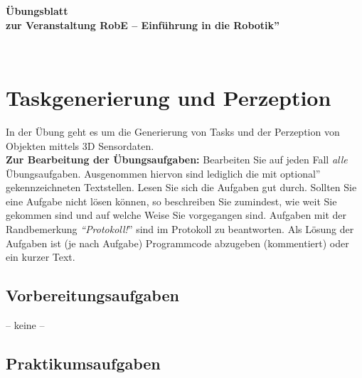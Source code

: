 \documentclass[ti,nofooter]{own-haw-page}
\begin{document}
\date{22.~November~2021}


\setcounter{section}{6}
\setcounter{dummymcpdsv}{\value{section}}
\addtocounter{dummymcpdsv}{1}


\begin{page}

\begin{Large}
{\centering \bfseries \"{U}bungsblatt \\ zur Veranstaltung  
\glqq RobE -- Einf\"{u}hrung in die Robotik''\\}
\end{Large}
~\\[-0.5cm]


\section{Taskgenerierung und Perzeption}

In der \"{U}bung  geht es um die Generierung von Tasks und der Perzeption von Objekten mittels 3D Sensordaten. \\


\textbf{Zur Bearbeitung der \"{U}bungsaufgaben:} Bearbeiten Sie auf jeden Fall
\textit{alle} \"{U}bungsaufgaben. Ausgenommen hiervon sind lediglich die mit \glqq
optional'' gekennzeichneten Textstellen. Lesen Sie sich die Aufgaben gut durch.
Sollten Sie eine Aufgabe nicht l\"{o}sen k\"{o}nnen, so beschreiben Sie
zumindest, wie weit Sie gekommen sind und auf welche Weise Sie vorgegangen sind.
%
Aufgaben mit der Randbemerkung \textit{``Protokoll!}'' sind 
im Protokoll zu beantworten.
Als L\"{o}sung der Aufgaben ist %
(je nach Aufgabe)
Programmcode abzugeben
(kommentiert) oder ein kurzer Text.


\subsection{Vorbereitungsaufgaben}


-- keine --

\subsection{Praktikumsaufgaben}


\end{page}
\end{document}
